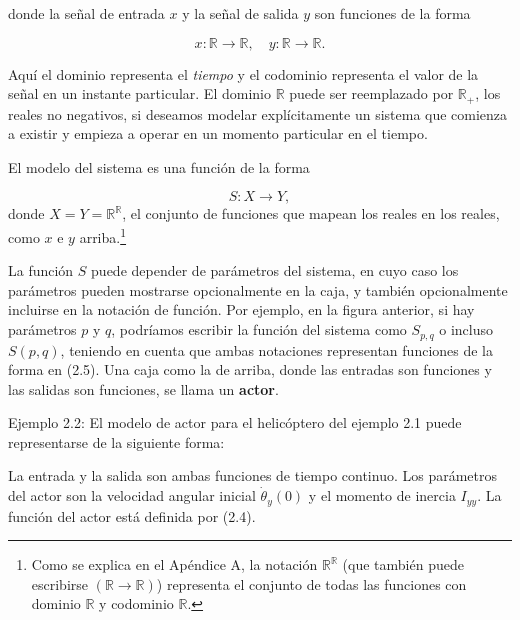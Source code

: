 \documentclass[12pt,a4paper]{article}
\begin{document}
donde la señal de entrada $x$ y la señal de salida $y$ son funciones de la forma

\[
x: \mathbb{R} \to \mathbb{R}, \quad y: \mathbb{R} \to \mathbb{R}.
\]
\newpage

\thispagestyle{fancy}
\fancyhf{} 
\fancyhead[R]{\textit{\textcolor{black}{2. DINÁMICA CONTINUA}}}

Aquí el dominio representa el \textit{tiempo} y el codominio representa el valor de la señal en un instante particular. 
El dominio $\mathbb{R}$ puede ser reemplazado por $\mathbb{R}_+$, los reales no negativos, si deseamos modelar explícitamente un sistema que comienza a existir y empieza a operar en un momento particular en el tiempo.  

El modelo del sistema es una función de la forma

\[
S: X \to Y, \tag{2.5}
\]
\setcounter{footnote}{2}
donde $X = Y = \mathbb{R}^{\mathbb{R}}$, el conjunto de funciones que mapean los reales en los reales, como $x$ e $y$ arriba.\footnote{Como se explica en el Apéndice A, la notación $\mathbb{R}^{\mathbb{R}}$ (que también puede escribirse $(\mathbb{R} \to \mathbb{R})$) representa el conjunto de todas las funciones con dominio $\mathbb{R}$ y codominio $\mathbb{R}$.} 

La función $S$ puede depender de parámetros del sistema, en cuyo caso los parámetros pueden mostrarse opcionalmente en la caja, y también opcionalmente incluirse en la notación de función.  
Por ejemplo, en la figura anterior, si hay parámetros $p$ y $q$, podríamos escribir la función del sistema como $S_{p,q}$ o incluso $S(p,q)$, teniendo en cuenta que ambas notaciones representan funciones de la forma en (2.5).  
Una caja como la de arriba, donde las entradas son funciones y las salidas son funciones, se llama un \textbf{actor}.  

\begin{tcolorbox}[colback=blue!10,colframe=blue!40!black]
Ejemplo 2.2: El modelo de actor para el helicóptero del ejemplo 2.1 puede representarse de la siguiente forma:

\begin{center}
\end{center}

La entrada y la salida son ambas funciones de tiempo continuo. 
Los parámetros del actor son la velocidad angular inicial $\dot{\theta}_y(0)$ y el momento de inercia $I_{yy}$.  
La función del actor está definida por (2.4).
\end{tcolorbox}
\end{document}
